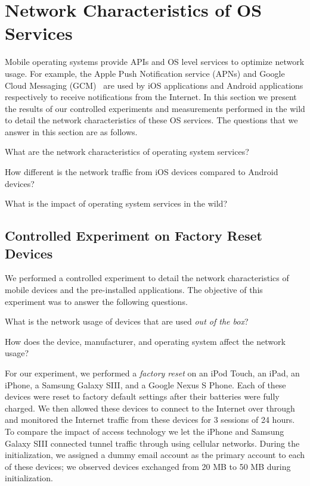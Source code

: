 \section{Network Characteristics of OS Services}
\label{sec:characterize-os}

Mobile operating systems provide APIs and OS level services to optimize network usage.
For example, the Apple Push Notification service (APNs) and Google Cloud Messaging (GCM)~\cite{gcm} are used by iOS applications and Android applications respectively to receive notifications from the Internet.
In this section we present the results of our controlled experiments and measurements performed in the wild to detail the network characteristics of these OS services.
The questions that we answer in this section are as follows.
\begin{packedenumerate}
\item What are the network characteristics of operating system services?
\item How different is the network traffic from iOS devices compared to Android devices?
\item What is the impact of operating system services in the wild?
\end{packedenumerate}

\subsection{Controlled Experiment on Factory Reset Devices}

We performed a controlled experiment to detail the network characteristics of mobile devices and the pre-installed applications.
The objective of this experiment was to answer the following questions.
\begin{packedenumerate}
\item What is the network usage of devices that are used \emph{out of the box}? 
\item How does the device, manufacturer, and operating system affect the network usage?
\end{packedenumerate}

For our experiment, we performed a \emph{factory reset} on an iPod Touch, an iPad, an iPhone, a Samsung Galaxy SIII, and a Google Nexus S Phone.
Each of these devices were reset to factory default settings after their batteries were fully charged. 
We then allowed these devices to connect to the Internet over \wifi through \platname and monitored the Internet traffic from these devices for 3 sessions of 24 hours. 
To compare the impact of access technology we let the iPhone and Samsung Galaxy SIII connected tunnel traffic through \platname using cellular networks. 
During the initialization, we assigned a dummy email account as the primary account to each of these devices; we observed devices exchanged from 20 MB to 50 MB during initialization. 

